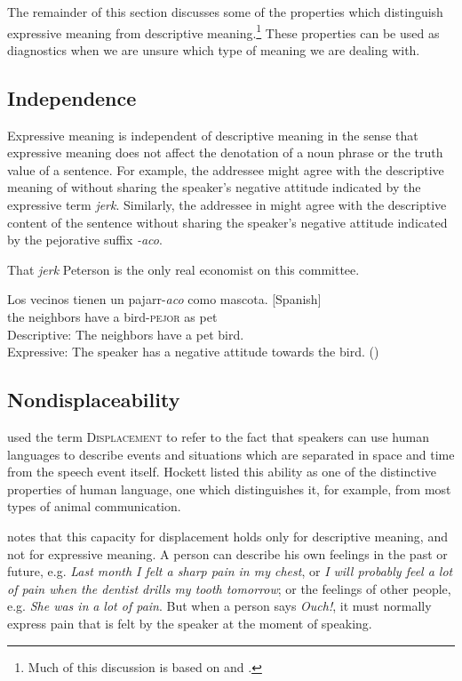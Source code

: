 The remainder of this section discusses some of the properties which distinguish expressive meaning from descriptive meaning.\footnote{Much of this discussion is based on \citet{Cruse1986,Cruse2000} and \citet{Potts2007c}.} These properties can be used as diagnostics when we are unsure which type of meaning we are dealing with.


\subsection{Independence}\label{sec:2.6.1}

Expressive meaning is independent of descriptive meaning in the sense that expressive meaning does not affect the denotation of a noun phrase or the truth value of a sentence. For example, the addressee might agree with the descriptive meaning of  without sharing the speaker’s negative attitude indicated by the expressive term \textit{jerk}. Similarly, the addressee in  might agree with the descriptive content of the sentence without sharing the speaker’s negative attitude indicated by the pejorative suffix \textit{-aco}.


\ea \label{ex:2.15}
That \textit{jerk} Peterson is the only real economist on this committee.
\z

\ea \label{ex:2.16}
\gll Los  vecinos  tienen  un  pajarr-\textit{aco}  como  mascota.  [Spanish]\\
the  neighbors  have  a  bird-\textsc{pejor}  as  pet\\
\glt Descriptive: The neighbors have a pet bird.\\
Expressive: The speaker has a negative attitude towards the bird.  (\citealt{Fortin2011})
\z

\subsection{Nondisplaceability}\label{sec:2.6.2}

\citet{Hockett1958,Hockett1960} used the term \textsc{Displacement} to refer to the fact that speakers can use human languages to describe events and situations which are separated in space and time from the speech event itself. Hockett listed this ability as one of the distinctive properties of human language, one which distinguishes it, for example, from most types of animal communication.



\citet[272]{Cruse1986} notes that this capacity for displacement holds only for descriptive meaning, and not for expressive meaning. A person can describe his own feelings in the past or future, e.g. \textit{Last month I felt a sharp pain in my chest}, or \textit{I will probably feel a lot of pain when the dentist drills my tooth tomorrow}; or the feelings of other people, e.g. \textit{She was in} \textit{a lot of pain}. But when a person says \textit{Ouch!}, it must normally express pain that is felt by the speaker at the moment of speaking.



